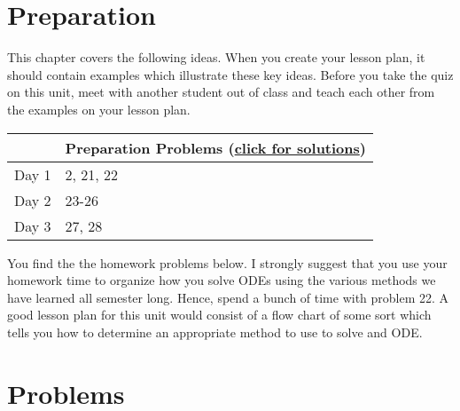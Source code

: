 
\section{Preparation}

\noindent  
This chapter covers the following ideas. When you create your lesson plan, it should contain examples which illustrate these key ideas. Before you take the quiz on this unit, meet with another student out of class and teach each other from the examples on your lesson plan. 



\begin{center}
\begin{tabular}{ll}
&Preparation Problems 
(\href{https://ilearn.byui.edu/bbcswebdav/institution/Physical\_Sci\_Eng/Mathematics/Personal\%20Folders/WoodruffB/316/12-PDEs-Preparation-Solutions.pdf}{click for solutions})
\\
\hline\hline
Day 1& 2, 21, 22
\\\hline
Day 2& 23-26
\\\hline
Day 3& 27, 28
\\\hline
\end{tabular}
\end{center}


You find the the homework problems below.  
I strongly suggest that you use your homework time to organize how you solve ODEs using the various methods we have learned all semester long. 
Hence, spend a bunch of time with problem 22. 
A good lesson plan for this unit would consist of a flow chart of some sort which tells you how to determine an appropriate method to use to solve and ODE.


\section{Problems}

